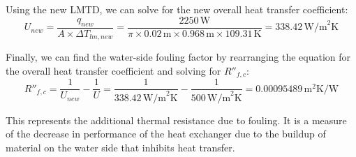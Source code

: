 \documentclass{article}
\begin{document}
Using the new LMTD, we can solve for the new overall heat transfer coefficient:
\begin{equation}
U_{new} = \frac{q_{new}}{A \times \Delta T_{lm,new}} = \frac{2250 \, \text{W}}{\pi \times 0.02 \, \text{m} \times 0.968 \, \text{m} \times 109.31 \, \text{K}} = 338.42 \, \text{W/m}^2\text{K}
\end{equation}

Finally, we can find the water-side fouling factor by rearranging the equation for the overall heat transfer coefficient and solving for \( R''_{f,c} \):
\begin{equation}
R''_{f,c} = \frac{1}{U_{new}} - \frac{1}{U} = \frac{1}{338.42 \, \text{W/m}^2\text{K}} - \frac{1}{500 \, \text{W/m}^2\text{K}} = 0.00095489 \, \text{m}^2\text{K/W}
\end{equation}

This represents the additional thermal resistance due to fouling. It is a measure of the decrease in performance of the heat exchanger due to the buildup of material on the water side that inhibits heat transfer.
\end{document}
